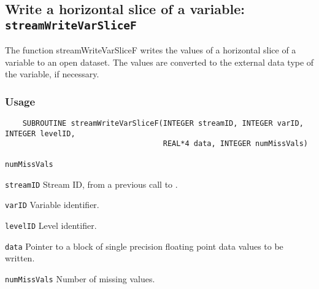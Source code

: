 \subsection{Write a horizontal slice of a variable: \texttt{streamWriteVarSliceF}}
\label{streamWriteVarSliceF}

The function streamWriteVarSliceF writes the values of a horizontal slice of a variable to an open dataset.
The values are converted to the external data type of the variable, if necessary.
\subsubsection*{Usage}

\begin{verbatim}
    SUBROUTINE streamWriteVarSliceF(INTEGER streamID, INTEGER varID, INTEGER levelID, 
                                    REAL*4 data, INTEGER numMissVals)
\end{verbatim}

\hspace*{4mm}\begin{minipage}[]{15cm}
\begin{deflist}{\texttt{numMissVals}\ }
\item[\texttt{streamID}]
Stream ID, from a previous call to {}.
\item[\texttt{varID}]
Variable identifier.
\item[\texttt{levelID}]
Level identifier.
\item[\texttt{data}]
Pointer to a block of single precision floating point data values to be written.
\item[\texttt{numMissVals}]
Number of missing values.

\end{deflist}
\end{minipage}
